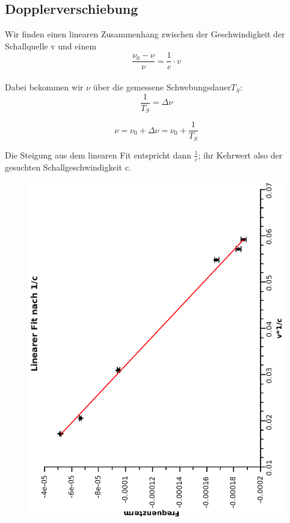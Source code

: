 \documentclass{article}
\begin{document}
\subsection{Dopplerverschiebung}
Wir finden einen linearen Zusammenhang zwischen der Geschwindigkeit der Schallquelle v und einem 
\begin{equation}
\label{frequenzlinear}
\frac{\nu_0-\nu}{\nu}=\frac{1}{c}\cdot v
\end{equation}
\\
Dabei bekommen wir $\nu$ über die gemessene Schwebungsdauer$T_S$:
\begin{equation}
\frac{1}{T_S}=\Delta \nu
\end{equation}

\begin{equation}
\nu=\nu_0+\Delta \nu = \nu_0 + \frac{1}{T_S}
\end{equation}

Die Steigung aus dem linearen Fit entspricht dann $\frac{1}{c}$; ihr Kehrwert also der gesuchten Schallgeschwindigkeit c.

\begin{figure}
\includegraphics[scale=0.4,angle=-90]{dopplerfit.eps}
\end{figure}
\end{document}

